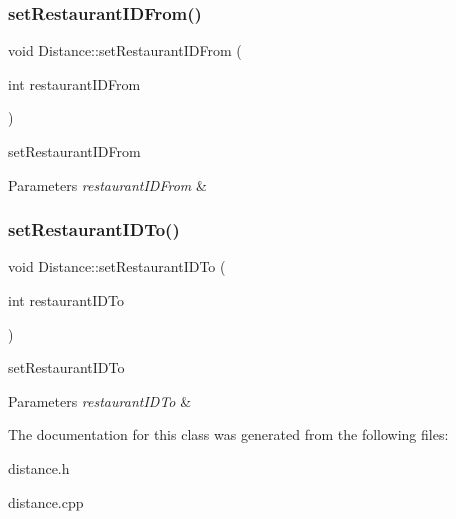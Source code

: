 \subsubsection{\texorpdfstring{set\+Restaurant\+I\+D\+From()}{setRestaurantIDFrom()}}
{\footnotesize\ttfamily void Distance\+::set\+Restaurant\+I\+D\+From (\begin{DoxyParamCaption}\item[{int}]{restaurant\+I\+D\+From }\end{DoxyParamCaption})}



set\+Restaurant\+I\+D\+From 


\begin{DoxyParams}{Parameters}
{\em restaurant\+I\+D\+From} & \\
\hline
\end{DoxyParams}
\mbox{\label{class_distance_a3fc24cd557605c2731ed9f379da3bb94}} 
\subsubsection{\texorpdfstring{set\+Restaurant\+I\+D\+To()}{setRestaurantIDTo()}}
{\footnotesize\ttfamily void Distance\+::set\+Restaurant\+I\+D\+To (\begin{DoxyParamCaption}\item[{int}]{restaurant\+I\+D\+To }\end{DoxyParamCaption})}



set\+Restaurant\+I\+D\+To 


\begin{DoxyParams}{Parameters}
{\em restaurant\+I\+D\+To} & \\
\hline
\end{DoxyParams}


The documentation for this class was generated from the following files\+:\begin{DoxyCompactItemize}
\item 
distance.\+h\item 
distance.\+cpp\end{DoxyCompactItemize}
